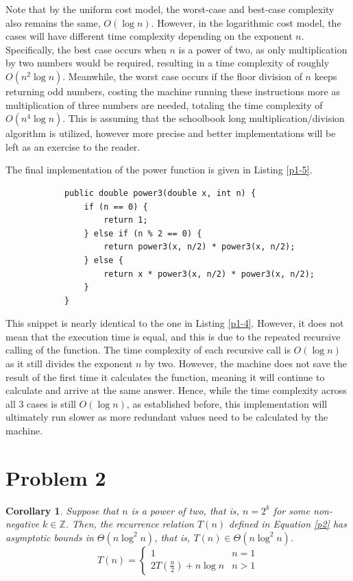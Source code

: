 \documentclass{report}
\newtheorem{corollary}{Corollary}
\begin{document}
\begin{description}
	Note that by the uniform cost model, the worst-case and best-case complexity also remains the same, $O(\log n)$. However, in the logarithmic cost model, the cases will have different time complexity depending on the exponent $n$. Specifically, the best case occurs when $n$ is a power of two, as only multiplication by two numbers would be required, resulting in a time complexity of roughly $O(n^2 \log n)$. Meanwhile, the worst case occurs if the floor division of $n$ keeps returning odd numbers, costing the machine running these instructions more as multiplication of three numbers are needed, totaling the time complexity of $O(n^4 \log n)$. This is assuming that the schoolbook long multiplication/division algorithm is utilized, however more precise and better implementations will be left as an exercise to the reader.
	
	\item[Power Function 3] The final implementation of the power function is given in Listing \ref{p1-5}.
	\begin{listing}[h]
		\begin{verbatim}
			public double power3(double x, int n) {
				if (n == 0) {
					return 1;
				} else if (n % 2 == 0) {
					return power3(x, n/2) * power3(x, n/2);
				} else {
					return x * power3(x, n/2) * power3(x, n/2);
				}
			}
		\end{verbatim}
		\caption{Code snippet.}
		\label{p1-5}
	\end{listing}
	
	This snippet is nearly identical to the one in Listing \ref{p1-4}. However, it does not mean that the execution time is equal, and this is due to the repeated recursive calling of the function. The time complexity of each recursive call is $O(\log n)$ as it still divides the exponent $n$ by two. However, the machine does not save the result of the first time it calculates the function, meaning it will continue to calculate and arrive at the same answer. Hence, while the time complexity across all 3 cases is still $O(\log n)$, as established before, this implementation will ultimately run slower as more redundant values need to be calculated by the machine. 
	
\end{description}

\section{Problem 2}
\begin{corollary}
	Suppose that $n$ is a power of two, that is, $n=2^k$ for some non-negative $k \in \mathbb{Z}$. Then, the recurrence relation $T(n)$ defined in Equation \ref{p2} has asymptotic bounds in $\Theta\left(n\log^2n\right)$, that is, $T(n) \in \Theta\left(n\log^2n\right)$.
	\begin{equation}
		T(n) =
		\begin{cases}
			1 & n=1 \\
			2T(\frac{n}{2}) + n\log n & n > 1
		\end{cases}
		\label{p2}
	\end{equation}
\end{corollary}
\end{document}
